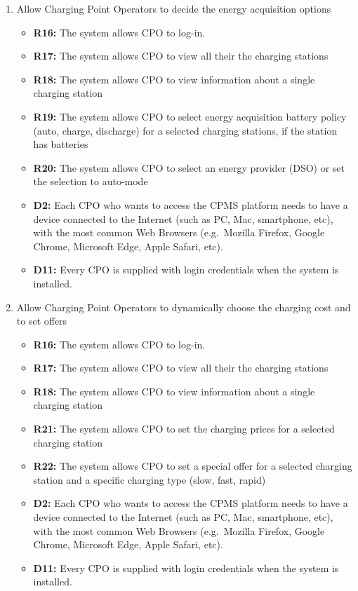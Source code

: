 \begin{enumerate}[label=\textbf{-G\arabic*}:]
          \item {Allow Charging Point Operators to decide the energy acquisition options
          \begin{itemize}
              \item \textbf{R16:} The system allows CPO to log-in.
              \item \textbf{R17:} The system allows CPO to view all their the charging stations 
              \item \textbf{R18:} The system allows CPO to view information about a single charging station
              \item \textbf{R19:} The system allows CPO to select energy acquisition battery policy (auto, charge, discharge) for a selected charging stations, if the station has batteries
              \item \textbf{R20:} The system allows CPO to select an energy provider (DSO) or set the selection to auto-mode 
              \item \textbf{D2:} Each CPO who wants to access the CPMS platform needs to have a device connected to the Internet (such as PC, Mac, smartphone, etc), with the most common Web Browsers (e.g.\ Mozilla Firefox, Google Chrome, Microsoft Edge, Apple Safari, etc).
              \item \textbf{D11:} Every CPO is supplied with login credentials when the system is installed.              
          \end{itemize}
          }


          \item {Allow Charging Point Operators to dynamically choose the charging cost and to set offers
          \begin{itemize}
            \item \textbf{R16:} The system allows CPO to log-in.
            \item \textbf{R17:} The system allows CPO to view all their the charging stations 
            \item \textbf{R18:} The system allows CPO to view information about a single charging station
            \item \textbf{R21:} The system allows CPO to set the charging prices for a selected charging station
            \item \textbf{R22:} The system allows CPO to set a special offer for a selected charging station and a specific charging type (slow, fast, rapid)
            \item \textbf{D2:} Each CPO who wants to access the CPMS platform needs to have a device connected to the Internet (such as PC, Mac, smartphone, etc), with the most common Web Browsers (e.g.\ Mozilla Firefox, Google Chrome, Microsoft Edge, Apple Safari, etc).
            \item \textbf{D11:} Every CPO is supplied with login credentials when the system is installed.              
          \end{itemize}
          }
\end{enumerate}

